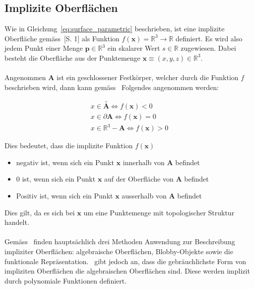 \subsection{Implizite Oberflächen}
\label{subsec:implicit_surfaces}

Wie in Gleichung~\ref{eq:surface_parametric} beschrieben, ist eine implizite
Oberfläche gemäss~\cite{hart_ray_1993}[S. 1] als Funktion $ f(\bm{x}) =
\mathbb{R}^{3} \to \mathbb{R} $ definiert.  Es wird also jedem Punkt einer
Menge $ \bm{p} \in \mathbb{R}^{3} $ ein skalarer Wert $ s \in \mathbb{R} $
zugewiesen. Dabei besteht die Oberfläche aus der Punktemenge $ \bm{x} \equiv
(x, y, z) \in \mathbb{R}^{3} $.\\
\\
Angenommen $ \bm{A} $ ist ein geschlossener Festkörper, welcher durch die
Funktion $f$ beschrieben wird, dann kann gemäss~\cite{hart_ray_1993} Folgendes
angenommen werden:

\begin{gather} \label{eq:surface_implicit_condition}
    x \in \overset{\circ}{\bm{A}} \Leftrightarrow f(\bm{x}) < 0 \\
    x \in \partial \bm{A}         \Leftrightarrow f(\bm{x}) = 0 \\
    x \in \mathbb{R}^{3} - \bm{A} \Leftrightarrow f(\bm{x}) > 0
\end{gather}

Dies bedeutet, dass die implizite Funktion $ f(\bm{x}) $
\begin{itemize}
    \item negativ ist, wenn sich ein Punkt $\bm{x}$ innerhalb von $\bm{A}$
        befindet
    \item 0 ist, wenn sich ein Punkt $\bm{x}$ auf der Oberfläche von $\bm{A}$
        befindet
    \item Positiv ist, wenn sich ein Punkt $\bm{x}$ ausserhalb von $\bm{A}$
        befindet
\end{itemize}

Dies gilt, da es sich bei $ \bm{x} $ um eine Punktemenge mit topologischer
Struktur handelt.\\
\\
Gemäss~\cite{division_introduction_1996} finden hauptsächlich drei Methoden
Anwendung zur Beschreibung impliziter Oberflächen: algebraische Oberflächen,
Blobby-Objekte sowie die funktionale Repräsentation.~\cite{hart_sphere_1994}
gibt jedoch an, dass die gebräuchlichste Form von impliziten Oberflächen die
algebraischen Oberflächen sind. Diese werden implizit durch polynomiale
Funktionen definiert.\\


